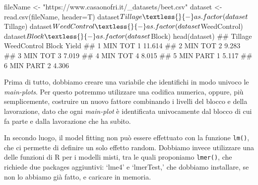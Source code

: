 \documentclass[a4paper,12pt,oneside]{book}
\newenvironment{Shaded}{\begin{snugshade}}{\end{snugshade}}
\newcommand{\SpecialCharTok}[1]{#1}
\newcommand{\StringTok}[1]{#1}
\newcommand{\DocumentationTok}[1]{#1}
\newcommand{\OtherTok}[1]{#1}
\newcommand{\FunctionTok}[1]{#1}
\newcommand{\AttributeTok}[1]{#1}
\newcommand{\NormalTok}[1]{#1}
\begin{document}
\begin{Shaded}
\begin{Highlighting}[]
\NormalTok{fileName }\OtherTok{\textless{}{-}} \StringTok{"https://www.casaonofri.it/\_datasets/beet.csv"}
\NormalTok{dataset }\OtherTok{\textless{}{-}} \FunctionTok{read.csv}\NormalTok{(fileName, }\AttributeTok{header=}\NormalTok{T)}
\NormalTok{dataset}\SpecialCharTok{$}\NormalTok{Tillage }\OtherTok{\textless{}{-}} \FunctionTok{as.factor}\NormalTok{(dataset}\SpecialCharTok{$}\NormalTok{Tillage)}
\NormalTok{dataset}\SpecialCharTok{$}\NormalTok{WeedControl }\OtherTok{\textless{}{-}} \FunctionTok{as.factor}\NormalTok{(dataset}\SpecialCharTok{$}\NormalTok{WeedControl)}
\NormalTok{dataset}\SpecialCharTok{$}\NormalTok{Block }\OtherTok{\textless{}{-}} \FunctionTok{as.factor}\NormalTok{(dataset}\SpecialCharTok{$}\NormalTok{Block)}
\FunctionTok{head}\NormalTok{(dataset)}
\DocumentationTok{\#\#   Tillage WeedControl Block  Yield}
\DocumentationTok{\#\# 1     MIN         TOT     1 11.614}
\DocumentationTok{\#\# 2     MIN         TOT     2  9.283}
\DocumentationTok{\#\# 3     MIN         TOT     3  7.019}
\DocumentationTok{\#\# 4     MIN         TOT     4  8.015}
\DocumentationTok{\#\# 5     MIN        PART     1  5.117}
\DocumentationTok{\#\# 6     MIN        PART     2  4.306}
\end{Highlighting}
\end{Shaded}

Prima di tutto, dobbiamo creare una variabile che identifichi in modo univoco le \emph{main-plots}. Per questo potremmo utilizzare una codifica numerica, oppure, più semplicemente, costruire un nuovo fattore combinando i livelli del blocco e della lavorazione, dato che ogni \emph{main-plot} è identificata univocamente dal blocco di cui fa parte e dalla lavorazione che ha subito.

\begin{Shaded}
\end{Shaded}

In secondo luogo, il model fitting non può essere effettuato con la funzione \texttt{lm()}, che ci permette di definire un solo effetto random. Dobbiamo invece utilizzare una delle funzioni di R per i modelli misti, tra le quali proponiamo \texttt{lmer()}, che richiede due packages aggiuntivi: `lme4' e `lmerTest,' che dobbiamo installare, se non lo abbiamo già fatto, e caricare in memoria.
\end{document}

